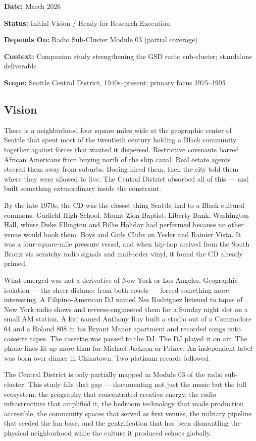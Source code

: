 \documentclass[11pt,letterpaper]{article}
\newcommand{\metafield}[2]{\textbf{\sffamily #1} #2\par}
\begin{document}
\metafield{Date:}{March 2026}
\metafield{Status:}{Initial Vision / Ready for Research Execution}
\metafield{Depends On:}{Radio Sub-Cluster Module 03 (partial coverage)}
\metafield{Context:}{Companion study strengthening the GSD radio sub-cluster; standalone deliverable}
\metafield{Scope:}{Seattle Central District, 1940s--present; primary focus 1975--1995}

\subsection{Vision}

There is a neighborhood four square miles wide at the geographic center of Seattle that spent most of the twentieth century holding a Black community together against forces that wanted it dispersed. Restrictive covenants barred African Americans from buying north of the ship canal. Real estate agents steered them away from suburbs. Boeing hired them, then the city told them where they were allowed to live. The Central District absorbed all of this --- and built something extraordinary inside the constraint.

By the late 1970s, the CD was the closest thing Seattle had to a Black cultural commons. Garfield High School. Mount Zion Baptist. Liberty Bank. Washington Hall, where Duke Ellington and Billie Holiday had performed because no other venue would book them. Boys and Girls Clubs on Yesler and Rainier Vista. It was a four-square-mile pressure vessel, and when hip-hop arrived from the South Bronx via scratchy radio signals and mail-order vinyl, it found the CD already primed.

What emerged was not a derivative of New York or Los Angeles. Geographic isolation --- the sheer distance from both coasts --- forced something more interesting. A Filipino-American DJ named Nes Rodriguez listened to tapes of New York radio shows and reverse-engineered them for a Sunday night slot on a small AM station. A kid named Anthony Ray built a studio out of a Commodore 64 and a Roland 808 in his Bryant Manor apartment and recorded songs onto cassette tapes. The cassette was passed to the DJ. The DJ played it on air. The phone lines lit up more than for Michael Jackson or Prince. An independent label was born over dinner in Chinatown. Two platinum records followed.

The Central District is only partially mapped in Module 03 of the radio sub-cluster. This study fills that gap --- documenting not just the music but the full ecosystem: the geography that concentrated creative energy, the radio infrastructure that amplified it, the bedroom technology that made production accessible, the community spaces that served as first venues, the military pipeline that seeded the fan base, and the gentrification that has been dismantling the physical neighborhood while the culture it produced echoes globally.
\end{document}
